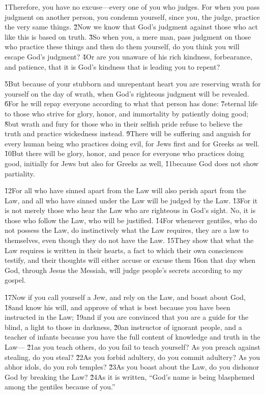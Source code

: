 \v{1}Therefore, you have no excuse---every one of you who judges. For when you pass judgment on another person, you condemn yourself, since you, the judge, practice the very same things. \v{2}Now we know that God's judgment against those who act like this is based on truth. \v{3}So when you, a mere man, pass judgment on those who practice these things and then do them yourself, do you think you will escape God's judgment? \v{4}Or are you unaware of his rich kindness, forbearance, and patience, that it is God's kindness that is leading you to repent?

\v{5}But because of your stubborn and unrepentant heart you are reserving wrath for yourself on the day of wrath, when God's righteous judgment will be revealed. \v{6}For he will repay everyone according to what that person has done: \v{7}eternal life to those who strive for glory, honor, and immortality by patiently doing good; \v{8}but wrath and fury for those who in their selfish pride refuse to believe the truth and practice wickedness instead. \v{9}There will be suffering and anguish for every human being who practices doing evil, for Jews first and for Greeks as well. \v{10}But there will be glory, honor, and peace for everyone who practices doing good, initially for Jews but also for Greeks as well, \v{11}because God does not show partiality.

\v{12}For all who have sinned apart from the Law will also perish apart from the Law, and all who have sinned under the Law will be judged by the Law. \v{13}For it is not merely those who hear the Law who are righteous in God's sight. No, it is those who follow the Law, who will be justified. \v{14}For whenever gentiles, who do not possess the Law, do instinctively what the Law requires, they are a law to themselves, even though they do not have the Law. \v{15}They show that what the Law requires is written in their hearts, a fact to which their own consciences testify, and their thoughts will either accuse or excuse them \v{16}on that day when God, through Jesus the Messiah, will judge people's secrets according to my gospel.

\v{17}Now if you call yourself a Jew, and rely on the Law, and boast about God, \v{18}and know his will, and approve of what is best because you have been instructed in the Law; \v{19}and if you are convinced that you are a guide for the blind, a light to those in darkness, \v{20}an instructor of ignorant people, and a teacher of infants because you have the full content of knowledge and truth in the Law--- \v{21}as you teach others, do you fail to teach yourself? As you preach against stealing, do you steal? \v{22}As you forbid adultery, do you commit adultery? As you abhor idols, do you rob temples? \v{23}As you boast about the Law, do you dishonor God by breaking the Law? \v{24}As it is written, ``God's name is being blasphemed among the gentiles because of you.''


